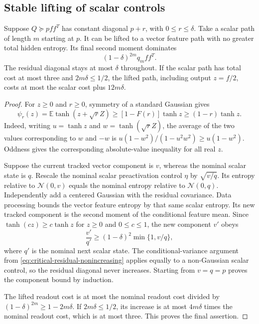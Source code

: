 \subsection{Stable lifting of scalar controls}

\begin{lemma}
\label{lem:critical-scalar-lift}
Suppose $Q\succeq pff^T$ has constant diagonal $p+r$, with
$0\le r\le\delta$. Take a scalar path of length $m$ starting at $p$.
It can be lifted to a vector feature path with no greater total hidden
entropy. Its final second moment dominates
\[
 (1-\delta)^{2m}q_mff^T.
\]
The residual diagonal stays at most $\delta$ throughout. If the scalar
path has total cost at most three and $2m\delta\le1/2$, the lifted path,
including output $z=f/2$, costs at most the scalar cost plus $12m\delta$.
\end{lemma}

\begin{proof}
For $z\ge0$ and $r\ge0$, symmetry of a standard Gaussian gives
\[
 \psi_r(z)=\mathbb E\tanh(z+\sqrt rZ)
 \ge[1-F(r)]\tanh z\ge(1-r)\tanh z.
\]
Indeed, writing $u=\tanh z$ and $w=\tanh(\sqrt rZ)$, the average of
the two values corresponding to $w$ and $-w$ is
$u(1-w^2)/(1-u^2w^2)\ge u(1-w^2)$. Oddness gives the corresponding
absolute-value inequality for all real $z$.

Suppose the current tracked vector component is $v$, whereas the
nominal scalar state is $q$. Rescale the nominal scalar preactivation
control $\eta$ by $\sqrt{v/q}$. Its entropy relative to
$\mathcal N(0,v)$ equals the nominal entropy relative to
$\mathcal N(0,q)$. Independently add a centered Gaussian with the
residual covariance. Data processing bounds the vector feature entropy
by that same scalar entropy. Its new tracked component is the second
moment of the conditional feature mean.
Since $\tanh(cz)\ge c\tanh z$ for $z\ge0$ and $0\le c\le1$,
the new component $v'$ obeys
\[
 \frac{v'}{q'}\ge(1-\delta)^2\min\{1,v/q\},
\]
where $q'$ is the nominal next scalar state.
The conditional-variance argument from
\eqref{eq:critical-residual-nonincreasing} applies equally to a
non-Gaussian scalar control, so the residual diagonal never increases.
Starting from $v=q=p$ proves the component bound by induction.

The lifted readout cost is at most the nominal readout cost divided by
$(1-\delta)^{2m}\ge1-2m\delta$. If $2m\delta\le1/2$, its increase is
at most $4m\delta$ times the nominal readout cost, which is at most three.
This proves the final assertion.
\end{proof}

